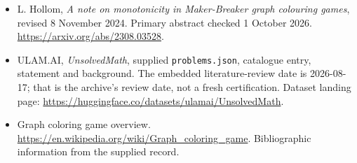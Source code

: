 \documentclass[11pt,a4paper]{article}
\begin{document}
{\small

\begin{itemize}
\item[E1] L. Hollom, \emph{A note on monotonicity in Maker-Breaker graph colouring games}, revised 8 November 2024. Primary abstract checked 1 October 2026. \url{https://arxiv.org/abs/2308.03528}.


\item[\hypertarget{source:statement:1}{S1}] ULAM.AI, \emph{UnsolvedMath}, supplied \texttt{problems.json}, catalogue entry, statement and background. The embedded literature-review date is 2026-08-17; that is the archive’s review date, not a fresh certification. Dataset landing page: \url{https://huggingface.co/datasets/ulamai/UnsolvedMath}.

\item[\hypertarget{source:statement:2}{S2}] Graph coloring game overview. \url{https://en.wikipedia.org/wiki/Graph_coloring_game}. Bibliographic information from the supplied record.

\end{itemize}

}

\label{end:statement}
\end{document}
